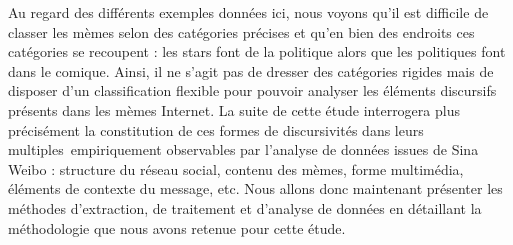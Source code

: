 Au regard des
diff\'erents exemples donn\'ees ici, nous voyons qu{\textquoteright}il
est difficile de classer les m\`emes selon des cat\'egories pr\'ecises
et qu{\textquoteright}en bien des endroits ces cat\'egories se
recoupent : les stars font de la politique alors que les politiques
font dans le comique. Ainsi, il ne s{\textquoteright}agit pas de
dresser des cat\'egories rigides mais de disposer d{\textquoteright}un
classification flexible pour pouvoir analyser les \'el\'ements
discursifs pr\'esents dans les m\`emes Internet. La suite de cette
\'etude interrogera plus pr\'ecis\'ement la constitution de ces formes
de discursivit\'es dans leurs multiples~empiriquement observables par
l{\textquoteright}analyse de donn\'ees issues de
\textcolor[rgb]{0.13333334,0.13333334,0.13333334}{Sina Weibo }:
structure du r\'eseau social, contenu des m\`emes, forme multim\'edia,
\'el\'ements de contexte du message, etc. Nous allons donc maintenant
pr\'esenter les m\'ethodes d{\textquoteright}extraction, de traitement
et d{\textquoteright}analyse de donn\'ees en d\'etaillant la
m\'ethodologie que nous avons retenue pour cette \'etude.